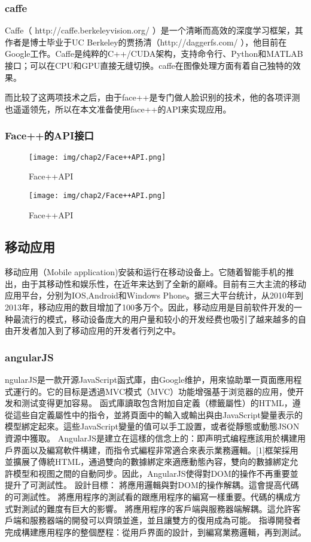 \subsubsection*{caffe}
Caffe（ http://caffe.berkeleyvision.org/ ）是一个清晰而高效的深度学习框架，其作者是博士毕业于UC Berkeley的贾扬清（http://daggerfs.com/ ），他目前在Google工作。Caffe是纯粹的C++/CUDA架构，支持命令行、Python和MATLAB接口；可以在CPU和GPU直接无缝切换。caffe在图像处理方面有着自己独特的效果。


而比较了这两项技术之后，由于face++是专门做人脸识别的技术，他的各项评测也遥遥领先，所以在本文准备使用face++的API来实现应用。
\subsubsection*{Face++的API接口}
\begin{figure}[h]
\begin{minipage}[t]{0.45\linewidth}
\centering
\texttt{[image: img/chap2/Face++API.png]}
\caption{Face++API\label{Face++API}}
\end{minipage}

\begin{minipage}[t]{0.45\linewidth}
\centering
\texttt{[image: img/chap2/Face++API.png]}
\caption{Face++API\label{Face++API}}
\end{minipage}

\end{figure}


\subsection{移动应用}
移动应用（Mobile application)安装和运行在移动设备上。它随着智能手机的推出，由于其移动性和娱乐性，在近年来达到了全新的巅峰。目前有三大主流的移动应用平台，分别为IOS,Android和Windows Phone。据三大平台统计，从2010年到2013年，移动应用的数目增加了100多万个。因此，移动应用是目前软件开发的一种最流行的模式，移动设备庞大的用户量和较小的开发经费也吸引了越来越多的自由开发者加入到了移动应用的开发者行列之中。
\subsubsection{angularJS}
ngularJS是一款开源JavaScript函式庫，由Google维护，用來協助單一頁面應用程式運行的。它的目标是透過MVC模式（MVC）功能增强基于浏览器的应用，使开发和测试变得更加容易。
函式庫讀取包含附加自定義（標籤屬性）的HTML，遵從這些自定義屬性中的指令，並將頁面中的輸入或輸出與由JavaScript變量表示的模型綁定起來。這些JavaScript變量的值可以手工設置，或者從靜態或動態JSON資源中獲取。
AngularJS是建立在這樣的信念上的：即声明式编程應該用於構建用戶界面以及編寫軟件構建，而指令式編程非常適合來表示業務邏輯。[1]框架採用並擴展了傳統HTML，通過雙向的數據綁定來適應動態內容，雙向的數據綁定允許模型和视图之間的自動同步。因此，AngularJS使得對DOM的操作不再重要並提升了可測試性。
設計目標：
將應用邏輯與對DOM的操作解耦。這會提高代碼的可測試性。
將應用程序的測試看的跟應用程序的編寫一樣重要。代碼的構成方式對測試的難度有巨大的影響。
將應用程序的客戶端與服務器端解耦。這允許客戶端和服務器端的開發可以齊頭並進，並且讓雙方的復用成為可能。
指導開發者完成構建應用程序的整個歷程：從用戶界面的設計，到編寫業務邏輯，再到測試。
